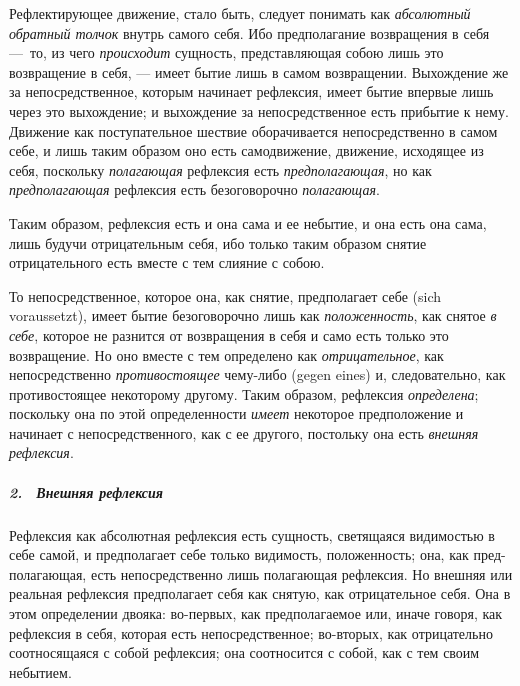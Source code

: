 Рефлектирующее движение, стало быть, следует понимать как
{\em абсолютный обратный толчок} внутрь самого себя.
Ибо предполагание возвращения в себя —~то, из чего
{\em происходит} сущность, представляющая собою лишь
это возвращение в себя, — имеет бытие лишь в самом возвращении. Выхождение
же за непосредственное, которым начинает рефлексия, имеет бытие впервые
лишь через это выхождение; и выхождение за непосредственное есть прибытие к
нему. Движение как поступательное шествие оборачивается непосредственно в
самом себе, и лишь таким образом оно есть самодвижение, движение, исходящее
из себя, поскольку {\em полагающая} рефлексия есть
{\em предполагающая}, но как
{\em предполагающая} рефлексия есть безоговорочно
{\em полагающая}.

Таким образом, рефлексия есть и она сама и ее небытие, и она есть она сама,
лишь будучи отрицательным себя, ибо только таким образом снятие
отрицательного есть вместе с тем слияние с собою.

То непосредственное, которое она, как снятие, предполагает себе (sich
voraussetzt), имеет бытие безоговорочно лишь как
{\em положенность}, как снятое
{\em в себе}, которое не разнится от возвращения в себя
и само есть только это возвращение. Но оно вместе с тем определено как
{\em отрицательное}, как непосредственно
{\em противостоящее} чему-либо (gegen eines) и,
следовательно, как противостоящее некоторому другому. Таким образом,
рефлексия {\em определена}; поскольку она по этой
определенности {\em имеет} некоторое предположение и
начинает с непосредственного, как с ее другого, постольку она есть
{\em внешняя рефлексия}.

\subparagraph[2. \ Внешняя рефлексия]{2. \ Внешняя рефлексия}
Рефлексия как абсолютная рефлексия есть
сущность, светящаяся видимостью в себе самой, и предполагает себе только
видимость, положенность; она, как пред-полагающая, есть непосредственно
лишь полагающая рефлексия. Но внешняя или реальная рефлексия предполагает
себя как снятую, как отрицательное себя. Она в этом определении двояка:
во-первых, как предполагаемое или, иначе говоря, как рефлексия в себя,
которая есть непосредственное; во-вторых, как отрицательно соотносящаяся с
собой рефлексия; она соотносится с собой, как с тем своим небытием.

